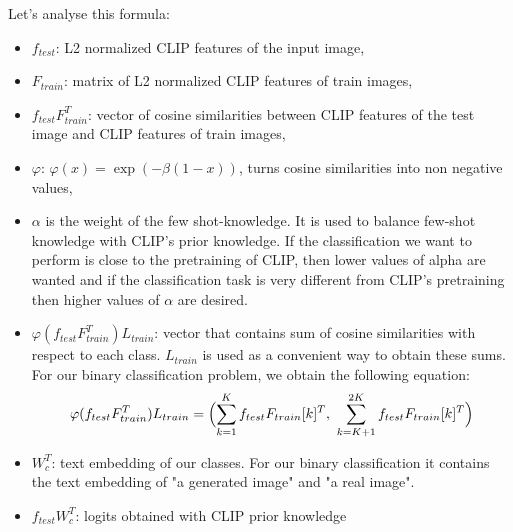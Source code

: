 \documentclass[12pt,a4paper]{article}
\begin{document}
\newcommand{\irow}[1]{%
  \begin{smallmatrix}(#1)\end{smallmatrix}%
}
Let's analyse this formula:
\begin{itemize}
    \item $f_{test}$: L2 normalized CLIP features of the input image,
    \item $F_{train}$: matrix of L2 normalized CLIP features of train images,
    \item $f_{test}F_{train}^T$: vector of cosine similarities between CLIP features of the test image and CLIP features of train images,
    \item $\varphi$: $\varphi(x) = \exp(-\beta(1-x))$, turns cosine similarities into non negative values,
    \item $\alpha$ is the weight of the few shot-knowledge. It is used to balance few-shot knowledge with CLIP's prior knowledge. If the classification we want to perform is close to the pretraining of CLIP, then lower values of alpha are wanted and if the classification task is very different from CLIP's pretraining then higher values of $\alpha$ are desired.
    \item $\varphi(f_{test}F_{train}^T)L_{train}$: vector that contains sum of cosine similarities with respect to each class. $L_{train}$ is used as a convenient way to obtain these sums. For our binary classification problem, we obtain the following equation:
    \begin{equation}
        \varphi(f_{test}F_{train}^T)L_{train} = \Bigl({\displaystyle\sum_{k=1}^K{f_{test} F_{train}[k]^T}},
        \ \displaystyle\sum_{k=K+1}^{2K}{f_{test} F_{train}[k]^T} \Bigr)\nonumber
    \end{equation}
    \item $W_c^T$: text embedding of our classes. For our binary classification it contains the text embedding of "a generated image" and "a real image".
    \item $f_{test}W_c^T$: logits obtained with CLIP prior knowledge
\end{itemize}
\end{document}
